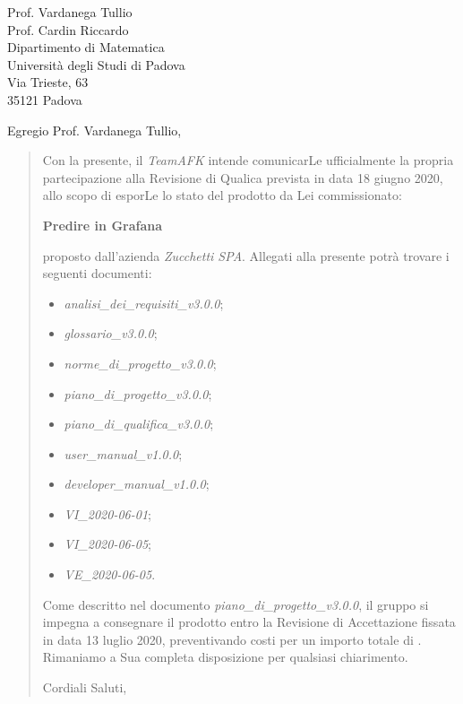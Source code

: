 \begin{letter}{
		Prof. Vardanega Tullio \\
		Prof. Cardin Riccardo \\
		Dipartimento di Matematica \\
		Università degli Studi di Padova \\
		Via Trieste, 63 \\
		35121 Padova}
		
\opening{Egregio Prof. Vardanega Tullio,}

\begin{quotation}
Con la presente, il \textit{TeamAFK} intende comunicarLe ufficialmente la propria partecipazione alla Revisione di Qualica prevista in data 18 giugno 2020, allo scopo di esporLe lo stato del prodotto da Lei commissionato:

\begin{center}
	\textbf{Predire in Grafana}
\end{center}

\noindent proposto dall'azienda \textit{Zucchetti SPA}.
Allegati alla presente potrà trovare i seguenti documenti:
\begin{itemize}
	\item \textit{analisi\_dei\_requisiti\_v3.0.0};
	
	\item \textit{glossario\_v3.0.0};
	
	\item \textit{norme\_di\_progetto\_v3.0.0};

	\item \textit{piano\_di\_progetto\_v3.0.0};

	\item \textit{piano\_di\_qualifica\_v3.0.0};
	
	\item \textit{user\_manual\_v1.0.0};
	\item \textit{developer\_manual\_v1.0.0};
	
	\item \textit{VI\_2020-06-01};
	\item \textit{VI\_2020-06-05};
	\item \textit{VE\_2020-06-05}.
\end{itemize}
\noindent 
Come descritto nel documento \textit{piano\_di\_progetto\_v3.0.0}, il gruppo si impegna a consegnare il prodotto entro la Revisione di Accettazione fissata in data 13 luglio 2020, preventivando costi per un importo totale di \textbf{}.\\
Rimaniamo a Sua completa disposizione per qualsiasi chiarimento.

\vspace{0.5cm}
\closing{ Cordiali Saluti,}
	

\end{quotation}
		
\end{letter}